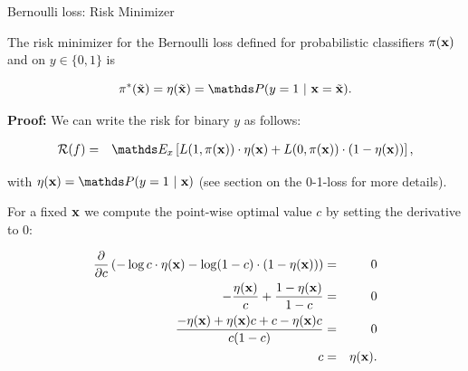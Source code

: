 \documentclass[11pt,compress,t,notes=noshow, xcolor=table]{beamer}
\begin{document}
\begin{vbframe}{Bernoulli loss: Risk Minimizer}

The risk minimizer for the Bernoulli loss defined for probabilistic classifiers $\pi(\mathbf{x})$ and on $y \in \{0, 1\}$ is

$$
  \piastxtil = \eta(\xtil) = \P(y = 1 ~|~ \xv = \xtil). 
$$

\vspace*{0.2cm}

\begin{footnotesize}
\textbf{Proof:} We can write the risk for binary $y$ as follows: 





\vspace*{-0.3cm}

\begin{eqnarray*}
  \riskf &=& \E_x \left[L(1, \pix) \cdot \eta(\xv) + L(0, \pix) \cdot (1 - \eta(\xv)) \right],
\end{eqnarray*}

with $\eta(\xv) = \P(y = 1 ~|~ \xv)$ (see section on the 0-1-loss for more details). 

For a fixed $\mathbf{x}$ we compute the point-wise optimal value $c$ by setting the derivative to $0$: 

\vspace*{-0.3cm}

\begin{eqnarray*}
  \frac{\partial }{\partial c} \left(- \log c  \cdot \eta(\mathbf{x})- \log (1 - c) \cdot (1 - \eta(\mathbf{x}))\right) &=& 0 \\
  - \frac{\eta(\mathbf{x})}{c} + \frac{1 - \eta(\mathbf{x})}{1 - c} &=& 0 \\
  \frac{- \eta(\mathbf{x}) + \eta(\mathbf{x}) c + c - \eta(\mathbf{x}) c}{c (1 - c)} &=& 0 \\
  c &=& \eta(\mathbf{x}). 
\end{eqnarray*}


\end{footnotesize}
\end{vbframe}
\end{document}
